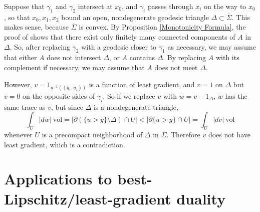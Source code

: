 \documentclass[reqno,12pt,letterpaper]{amsart}
\newcommand{\vol}{\mathrm{vol}}
\theoremstyle{definition}
\numberwithin{equation}{section}
\begin{document}
Suppose that $\gamma_1$ and $\gamma_2$ intersect at $x_0$, and $\gamma_i$ passes through $x_i$ on the way to $x_0$, so that $x_0, x_1, x_2$ bound an open, nondegenerate geodesic triangle $\Delta \subset \overline \Sigma$. This makes sense, because $\overline \Sigma$ is convex.
By Proposition \ref{Monotonicity Formula}, the proof of \cite[Remark 37.9]{simon1983GMT} shows that there exist only finitely many connected components of $A$ in $\Delta$.
So, after replacing $\gamma_2$ with a geodesic closer to $\gamma_1$ as necessary, we may assume that either $A$ does not intersect $\Delta$, or $A$ contains $\Delta$.
By replacing $A$ with its complement if necessary, we may assume that $A$ does not meet $\Delta$.

However, $v = 1_{u^{-1}((y_1, y_2))}$ is a function of least gradient, and $v = 1$ on $\Delta$ but $v = 0$ on the opposite sides of $\gamma_i$.
So if we replace $v$ with $w = v - 1_\Delta$, $w$ has the same trace as $v$, but since $\Delta$ is a nondegenerate triangle,
$$\int_U |dw| ~\vol = |\partial(\{u > y\} \setminus \Delta) \cap U| < |\partial \{u > y\} \cap U| = \int_U |dv| ~\vol$$
whenever $U$ is a precompact neighborhood of $\overline \Delta$ in $\overline \Sigma$.
Therefore $v$ does not have least gradient, which is a contradiction.


\section{Applications to best-Lipschitz/least-gradient duality}
\label{duality}



\printbibliography
\end{document}
